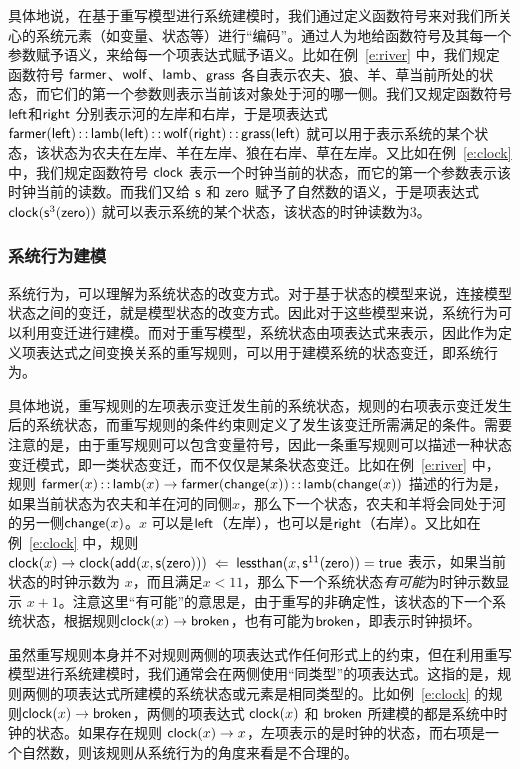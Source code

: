 具体地说，在基于重写模型进行系统建模时，我们通过定义函数符号来对我们所关心的系统元素（如变量、状态等）进行“编码”。通过人为地给函数符号及其每一个参数赋予语义，来给每一个项表达式赋予语义。比如在例~\ref{e:river} 中，我们规定函数符号 $\farmer$、$\wolf$、$\lamb$、$\grass$ 各自表示农夫、狼、羊、草当前所处的状态，而它们的第一个参数则表示当前该对象处于河的哪一侧。我们又规定函数符号 $\lhs$和$\rhs$ 分别表示河的左岸和右岸，于是项表达式 $\farmer(\lhs) \comp \lamb(\lhs) \comp \wolf(\rhs) \comp \grass(\lhs)$ 就可以用于表示系统的某个状态，该状态为农夫在左岸、羊在左岸、狼在右岸、草在左岸。又比如在例~\ref{e:clock} 中，我们规定函数符号 $\clock$ 表示一个时钟当前的状态，而它的第一个参数表示该时钟当前的读数。而我们又给 $\s$ 和 $\zero$ 赋予了自然数的语义，于是项表达式 $\clock(\s^3(\zero))$ 就可以表示系统的某个状态，该状态的时钟读数为3。

\subsubsection{系统行为建模}

系统行为，可以理解为系统状态的改变方式。对于基于状态的模型来说，连接模型状态之间的变迁，就是模型状态的改变方式。因此对于这些模型来说，系统行为可以利用变迁进行建模。而对于重写模型，系统状态由项表达式来表示，因此作为定义项表达式之间变换关系的重写规则，可以用于建模系统的状态变迁，即系统行为。

具体地说，重写规则的左项表示变迁发生前的系统状态，规则的右项表示变迁发生后的系统状态，而重写规则的条件约束则定义了发生该变迁所需满足的条件。需要注意的是，由于重写规则可以包含变量符号，因此一条重写规则可以描述一种状态变迁模式，即一类状态变迁，而不仅仅是某条状态变迁。比如在例~\ref{e:river} 中，规则 $\farmer(x)\comp \lamb(x) \ra \farmer(\change(x))\comp\lamb(\change(x))$ 描述的行为是，如果当前状态为农夫和羊在河的同侧$x$，那么下一个状态，农夫和羊将会同处于河的另一侧$\change(x)$。$x$ 可以是$\lhs$（左岸），也可以是$\rhs$（右岸）。又比如在例~\ref{e:clock} 中，规则 $\clock(x) \ra \clock(\add(x,\s(\zero))) \;\Dla\; \lessthan(x,\s^{11}(\zero)) = \true$ 表示，如果当前状态的时钟示数为 $x$，而且满足$x < 11$，那么下一个系统状态\emph{有可能}为时钟示数显示 $x+1$。注意这里“有可能”的意思是，由于重写的非确定性，该状态的下一个系统状态，根据规则$\clock(x) \ra \broken$，也有可能为$\broken$，即表示时钟损坏。

虽然重写规则本身并不对规则两侧的项表达式作任何形式上的约束，但在利用重写模型进行系统建模时，我们通常会在两侧使用“同类型”的项表达式。这指的是，规则两侧的项表达式所建模的系统状态或元素是相同类型的。比如例~\ref{e:clock} 的规则$\clock(x) \ra \broken$，两侧的项表达式 $\clock(x)$ 和 $\broken$ 所建模的都是系统中时钟的状态。如果存在规则 $\clock(x) \ra x$，左项表示的是时钟的状态，而右项是一个自然数，则该规则从系统行为的角度来看是不合理的。

